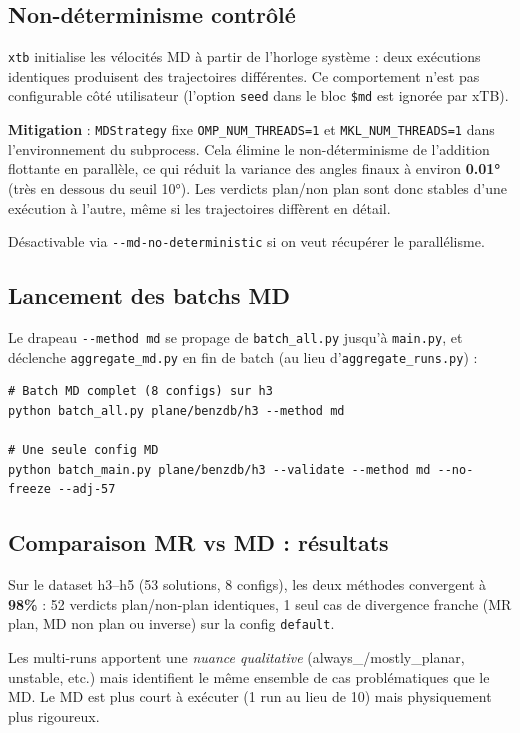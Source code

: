 \subsection{Non-déterminisme contrôlé}

\texttt{xtb} initialise les vélocités MD à partir de l'horloge système : deux exécutions
identiques produisent des trajectoires différentes. Ce comportement n'est pas configurable
côté utilisateur (l'option \texttt{seed} dans le bloc \texttt{\$md} est ignorée par xTB).

\textbf{Mitigation} : \texttt{MDStrategy} fixe \texttt{OMP\_NUM\_THREADS=1} et
\texttt{MKL\_NUM\_THREADS=1} dans l'environnement du subprocess. Cela élimine
le non-déterminisme de l'addition flottante en parallèle, ce qui réduit la variance
des angles finaux à environ \textbf{0.01°} (très en dessous du seuil 10°). Les verdicts
plan/non plan sont donc stables d'une exécution à l'autre, même si les trajectoires
diffèrent en détail.

Désactivable via \texttt{-{}-md-no-deterministic} si on veut récupérer le parallélisme.

\subsection{Lancement des batchs MD}

Le drapeau \texttt{-{}-method md} se propage de \texttt{batch\_all.py} jusqu'à
\texttt{main.py}, et déclenche \texttt{aggregate\_md.py} en fin de batch (au lieu
d'\texttt{aggregate\_runs.py}) :

\begin{lstlisting}[style=benzai]
# Batch MD complet (8 configs) sur h3
python batch_all.py plane/benzdb/h3 --method md

# Une seule config MD
python batch_main.py plane/benzdb/h3 --validate --method md --no-freeze --adj-57
\end{lstlisting}

\subsection{Comparaison MR vs MD : résultats}

Sur le dataset h3--h5 (53 solutions, 8 configs), les deux méthodes convergent à
\textbf{98\%} : 52 verdicts plan/non-plan identiques, 1 seul cas de divergence franche
(MR plan, MD non plan ou inverse) sur la config \texttt{default}.

Les multi-runs apportent une \emph{nuance qualitative} (always\_/mostly\_planar,
unstable, etc.) mais identifient le même ensemble de cas problématiques que le MD.
Le MD est plus court à exécuter (1 run au lieu de 10) mais physiquement plus rigoureux.
